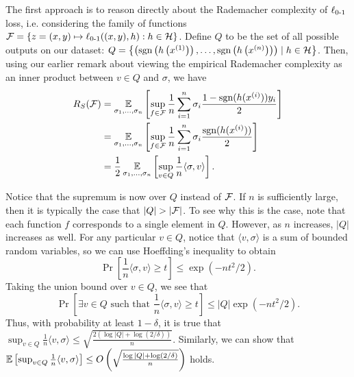 The first approach is to reason directly about the Rademacher complexity of $\ell_{\textup{0-1}}$ loss, i.e. considering the family of functions $\mathcal F = \left\{ z = (x, y) \mapsto \ell_{\textup{0-1}}((x, y), h) : h \in \mathcal H \right\}$. Define $Q$ to be the set of all possible outputs on our dataset: $Q=\left\{\left(\text{sgn}\left(h\left(x^{(1)}\right)\right), \dots, \text{sgn} \left(h\left(x^{(n)}\right)\right)\right)\mid  h \in \mathcal H \right\}$. Then, using our earlier remark about viewing the empirical Rademacher complexity as an inner product between $v\in Q$ and $\sigma$, we have
\begin{align}
R_S(\mathcal F) &= \operatorname*{\mathbb{E}}_{\sigma_1,\dots, \sigma_n} \left[ \sup_{f\in \mathcal F} \frac{1}{n} \sum^n_{i=1} \sigma_i \frac{1-\text{sgn}(h(x^{(i)}))y_i}{2} \right] \\
&= \operatorname*{\mathbb{E}}_{\sigma_1,\dots, \sigma_n} \left[ \sup_{f\in \mathcal F} \frac{1}{n} \sum^n_{i=1} \sigma_i \frac{\text{sgn}(h(x^{(i)}))}{2} \right] \\
&= \frac{1}{2}\operatorname*{\mathbb{E}}_{\sigma_1,\dots, \sigma_n} \left[ \sup_{v\in Q} \frac{1}{n} \langle \sigma, v\rangle \right].
\end{align}

Notice that the supremum is now over $Q$ instead of $\mathcal F$. If $n$ is sufficiently large, then it is typically the case that $|Q|>|\cF|$. To see why this is the case, note that each function $f$ corresponds to a single element in $Q$. However, as $n$ increases, $|Q|$ increases as well. For any particular $v\in Q$, notice that $\langle v, \sigma\rangle$ is a sum of bounded random variables, so we can use Hoeffding's inequality to obtain
\begin{equation}
\Pr\left[\frac{1}{n}\langle\sigma, v\rangle\geq t\right] \leq \exp (-n t^2 / 2).
\end{equation}
Taking the union bound over $v\in Q$, we see that 
\begin{equation}
\Pr\left[\exists v\in Q \text{ such that } \frac{1}{n}\langle\sigma, v\rangle \geq t\right] \leq |Q| \exp (-nt^2 / 2).
\end{equation}
Thus, with probability at least $1-\delta$, it is true that $\sup _{v \in Q} \frac{1}{n}\langle v, \sigma \rangle \leq \sqrt{\frac{2(\log|Q| + \log (2/\delta))}{n}}$. Similarly, we can show that $\operatorname*{\mathbb{E}} \left[ \sup _{v \in Q} \frac{1}{n}\langle v, \sigma \rangle \right] \leq O\left(\sqrt{\frac{\log|Q| + \log (2/\delta)}{n}}\right)$ holds.

